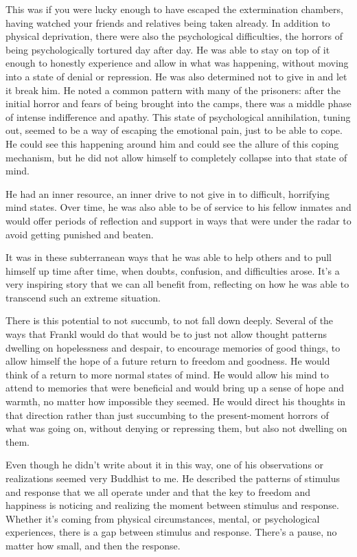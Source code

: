 This was if you were lucky enough to have escaped the extermination chambers, having watched your friends and relatives being taken already. In addition to physical deprivation, there were also the psychological difficulties, the horrors of being psychologically tortured day after day. He was able to stay on top of it enough to honestly experience and allow in what was happening, without moving into a state of denial or repression. He was also determined not to give in and let it break him. He noted a common pattern with many of the prisoners: after the initial horror and fears of being brought into the camps, there was a middle phase of intense indifference and apathy. This state of psychological annihilation, tuning out, seemed to be a way of escaping the emotional pain, just to be able to cope. He could see this happening around him and could see the allure of this coping mechanism, but he did not allow himself to completely collapse into that state of mind.

He had an inner resource, an inner drive to not give in to difficult, horrifying mind states. Over time, he was also able to be of service to his fellow inmates and would offer periods of reflection and support in ways that were under the radar to avoid getting punished and beaten.

It was in these subterranean ways that he was able to help others and to pull himself up time after time, when doubts, confusion, and difficulties arose. It's a very inspiring story that we can all benefit from, reflecting on how he was able to transcend such an extreme situation.

There is this potential to not succumb, to not fall down deeply. Several of the ways that Frankl would do that would be to just not allow thought patterns dwelling on hopelessness and despair, to encourage memories of good things, to allow himself the hope of a future return to freedom and goodness. He would think of a return to more normal states of mind. He would allow his mind to attend to memories that were beneficial and would bring up a sense of hope and warmth, no matter how impossible they seemed. He would direct his thoughts in that direction rather than just succumbing to the present-moment horrors of what was going on, without denying or repressing them, but also not dwelling on them.

Even though he didn't write about it in this way, one of his observations or realizations seemed very Buddhist to me. He described the patterns of stimulus and response that we all operate under and that the key to freedom and happiness is noticing and realizing the moment between stimulus and response. Whether it's coming from physical circumstances, mental, or psychological experiences, there is a gap between stimulus and response. There's a pause, no matter how small, and then the response.

